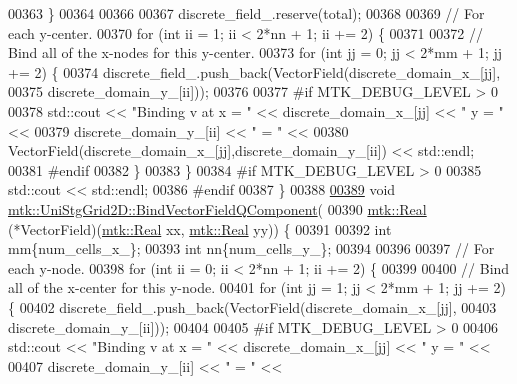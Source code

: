 \begin{DoxyCode}
00363   \}
00364 
00366 
00367   discrete\_field\_.reserve(total);
00368 
00369   \textcolor{comment}{// For each y-center.}
00370   \textcolor{keywordflow}{for} (\textcolor{keywordtype}{int} ii = 1; ii < 2*nn + 1; ii += 2) \{
00371 
00372     \textcolor{comment}{// Bind all of the x-nodes for this y-center.}
00373     \textcolor{keywordflow}{for} (\textcolor{keywordtype}{int} jj = 0; jj < 2*mm + 1; jj += 2) \{
00374       discrete\_field\_.push\_back(VectorField(discrete\_domain\_x\_[jj],
00375                                             discrete\_domain\_y\_[ii]));
00376 
00377 \textcolor{preprocessor}{      #if MTK\_DEBUG\_LEVEL > 0}
00378       std::cout << \textcolor{stringliteral}{"Binding v at x = "} << discrete\_domain\_x\_[jj] << \textcolor{stringliteral}{" y = "} <<
00379         discrete\_domain\_y\_[ii] << \textcolor{stringliteral}{" = "} <<
00380         VectorField(discrete\_domain\_x\_[jj],discrete\_domain\_y\_[ii]) << std::endl;
00381 \textcolor{preprocessor}{      #endif}
00382     \}
00383   \}
00384 \textcolor{preprocessor}{  #if MTK\_DEBUG\_LEVEL > 0}
00385   std::cout << std::endl;
00386 \textcolor{preprocessor}{  #endif}
00387 \}
00388 
\hypertarget{mtk__uni__stg__grid__2d_8cc_source_l00389}{}\hyperlink{classmtk_1_1UniStgGrid2D_a8b7ae23231a4a694073b6c22715a4375}{00389} \textcolor{keywordtype}{void} \hyperlink{classmtk_1_1UniStgGrid2D_a8b7ae23231a4a694073b6c22715a4375}{mtk::UniStgGrid2D::BindVectorFieldQComponent}(
00390   \hyperlink{group__c01-roots_gac080bbbf5cbb5502c9f00405f894857d}{mtk::Real} (*VectorField)(\hyperlink{group__c01-roots_gac080bbbf5cbb5502c9f00405f894857d}{mtk::Real} xx, \hyperlink{group__c01-roots_gac080bbbf5cbb5502c9f00405f894857d}{mtk::Real} yy)) \{
00391 
00392   \textcolor{keywordtype}{int} mm\{num\_cells\_x\_\};
00393   \textcolor{keywordtype}{int} nn\{num\_cells\_y\_\};
00394 
00396 
00397   \textcolor{comment}{// For each y-node.}
00398   \textcolor{keywordflow}{for} (\textcolor{keywordtype}{int} ii = 0; ii < 2*nn + 1; ii += 2) \{
00399 
00400     \textcolor{comment}{// Bind all of the x-center for this y-node.}
00401     \textcolor{keywordflow}{for} (\textcolor{keywordtype}{int} jj = 1; jj < 2*mm + 1; jj += 2) \{
00402       discrete\_field\_.push\_back(VectorField(discrete\_domain\_x\_[jj],
00403                                             discrete\_domain\_y\_[ii]));
00404 
00405 \textcolor{preprocessor}{      #if MTK\_DEBUG\_LEVEL > 0}
00406       std::cout << \textcolor{stringliteral}{"Binding v at x = "} << discrete\_domain\_x\_[jj] << \textcolor{stringliteral}{" y = "} <<
00407         discrete\_domain\_y\_[ii] << \textcolor{stringliteral}{" = "} <<

\end{DoxyCode}
